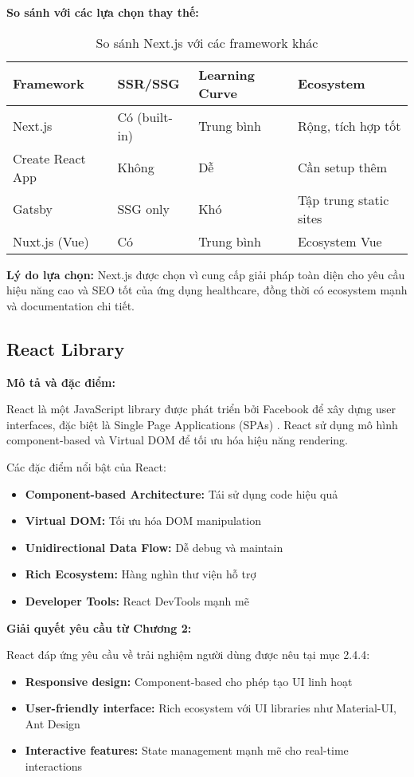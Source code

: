 \documentclass[../DoAn.tex]{subfiles}
\begin{document}
\textbf{So sánh với các lựa chọn thay thế:}

\begin{table}[H]
\centering
\begin{tabular}{|p{3cm}|p{3cm}|p{3cm}|p{4cm}|}
\hline
\textbf{Framework} & \textbf{SSR/SSG} & \textbf{Learning Curve} & \textbf{Ecosystem} \\
\hline
Next.js & Có (built-in) & Trung bình & Rộng, tích hợp tốt \\
\hline
Create React App & Không & Dễ & Cần setup thêm \\
\hline
Gatsby & SSG only & Khó & Tập trung static sites \\
\hline
Nuxt.js (Vue) & Có & Trung bình & Ecosystem Vue \\
\hline
\end{tabular}
\caption{So sánh Next.js với các framework khác}
\end{table}

\textbf{Lý do lựa chọn:} Next.js được chọn vì cung cấp giải pháp toàn diện cho yêu cầu hiệu năng cao và SEO tốt của ứng dụng healthcare, đồng thời có ecosystem mạnh và documentation chi tiết.

\subsection{React Library}
\label{subsection:3.1.2}

\textbf{Mô tả và đặc điểm:}

React là một JavaScript library được phát triển bởi Facebook để xây dựng user interfaces, đặc biệt là Single Page Applications (SPAs) \cite{react}. React sử dụng mô hình component-based và Virtual DOM để tối ưu hóa hiệu năng rendering.

Các đặc điểm nổi bật của React:
\begin{itemize}
    \item \textbf{Component-based Architecture:} Tái sử dụng code hiệu quả
    \item \textbf{Virtual DOM:} Tối ưu hóa DOM manipulation
    \item \textbf{Unidirectional Data Flow:} Dễ debug và maintain
    \item \textbf{Rich Ecosystem:} Hàng nghìn thư viện hỗ trợ
    \item \textbf{Developer Tools:} React DevTools mạnh mẽ
\end{itemize}

\textbf{Giải quyết yêu cầu từ Chương 2:}

React đáp ứng yêu cầu về trải nghiệm người dùng được nêu tại mục 2.4.4:
\begin{itemize}
    \item \textbf{Responsive design:} Component-based cho phép tạo UI linh hoạt
    \item \textbf{User-friendly interface:} Rich ecosystem với UI libraries như Material-UI, Ant Design
    \item \textbf{Interactive features:} State management mạnh mẽ cho real-time interactions
\end{itemize}
\end{document}
